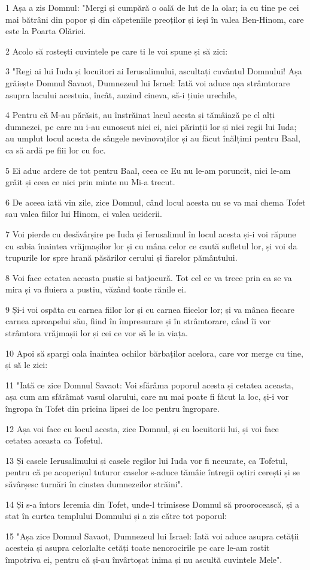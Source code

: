 \par 1 Așa a zis Domnul: "Mergi și cumpără o oală de lut de la olar; ia cu tine pe cei mai bătrâni din popor și din căpeteniile preoților și ieși în valea Ben-Hinom, care este la Poarta Olăriei.
\par 2 Acolo să rostești cuvintele pe care ti le voi spune și să zici:
\par 3 "Regi ai lui Iuda și locuitori ai Ierusalimului, ascultați cuvântul Domnului! Așa grăiește Domnul Savaot, Dumnezeul lui Israel: Iată voi aduce așa strâmtorare asupra lacului acestuia, încât, auzind cineva, să-i țiuie urechile,
\par 4 Pentru că M-au părăsit, au înstrăinat lacul acesta și tămâiază pe el alți dumnezei, pe care nu i-au cunoscut nici ei, nici părinții lor și nici regii lui Iuda; au umplut locul acesta de sângele nevinovaților și au făcut înălțimi pentru Baal, ca să ardă pe fiii lor cu foc.
\par 5 Ei aduc ardere de tot pentru Baal, ceea ce Eu nu le-am poruncit, nici le-am grăit și ceea ce nici prin minte nu Mi-a trecut.
\par 6 De aceea iată vin zile, zice Domnul, când locul acesta nu se va mai chema Tofet sau valea fiilor lui Hinom, ci valea uciderii.
\par 7 Voi pierde cu desăvârșire pe Iuda și Ierusalimul în locul acesta și-i voi răpune cu sabia înaintea vrăjmașilor lor și cu mâna celor ce caută sufletul lor, și voi da trupurile lor spre hrană păsărilor cerului și fiarelor pământului.
\par 8 Voi face cetatea aceasta pustie și batjocură. Tot cel ce va trece prin ea se va mira și va fluiera a pustiu, văzând toate rănile ei.
\par 9 Și-i voi ospăta cu carnea fiilor lor și cu carnea fiicelor lor; și va mânca fiecare carnea aproapelui său, fiind în împresurare și în strâmtorare, când îi vor strâmtora vrăjmașii lor și cei ce vor să le ia viața.
\par 10 Apoi să spargi oala înaintea ochilor bărbaților acelora, care vor merge cu tine, și să le zici:
\par 11 "Iată ce zice Domnul Savaot: Voi sfărâma poporul acesta și cetatea aceasta, așa cum am sfărâmat vasul olarului, care nu mai poate fi făcut la loc, și-i vor îngropa în Tofet din pricina lipsei de loc pentru îngropare.
\par 12 Așa voi face cu locul acesta, zice Domnul, și cu locuitorii lui, și voi face cetatea aceasta ca Tofetul.
\par 13 Și casele Ierusalimului și casele regilor lui Iuda vor fi necurate, ca Tofetul, pentru că pe acoperișul tuturor caselor s-aduce tămâie întregii oștiri cerești și se săvârșesc turnări în cinstea dumnezeilor străini".
\par 14 Și s-a întors Ieremia din Tofet, unde-l trimisese Domnul să proorocească, și a stat în curtea templului Domnului și a zis către tot poporul:
\par 15 "Așa zice Domnul Savaot, Dumnezeul lui Israel: Iată voi aduce asupra cetății acesteia și asupra celorlalte cetăți toate nenorocirile pe care le-am rostit împotriva ei, pentru că și-au învârtoșat inima și nu ascultă cuvintele Mele".

